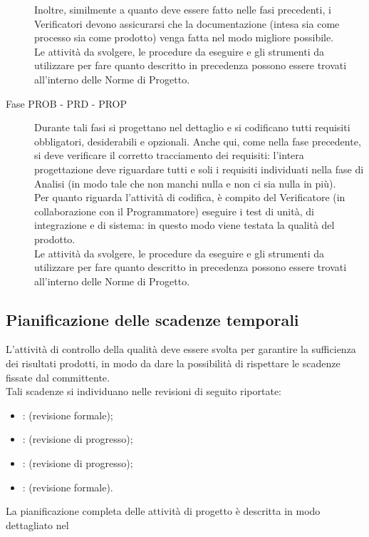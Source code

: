 \begin{description}
		Inoltre, similmente a quanto deve essere fatto nelle fasi precedenti, i Verificatori devono assicurarsi che la documentazione (intesa sia 
		come processo sia come prodotto) venga fatta nel modo migliore possibile.\\
		Le attività da svolgere, le procedure da eseguire e gli strumenti da utilizzare per fare quanto descritto in precedenza possono essere trovati 
		all'interno delle Norme di Progetto.
		\item[Fase PROB - PRD - PROP] Durante tali fasi si progettano nel dettaglio e si codificano tutti requisiti obbligatori, desiderabili e 
		opzionali. Anche qui, come nella fase precedente, si deve verificare il corretto tracciamento dei requisiti: l'intera progettazione deve 
		riguardare tutti e soli i requisiti individuati nella fase di Analisi (in modo tale che non manchi nulla e non ci sia nulla in più).\\
		Per quanto riguarda l'attività di codifica, è compito del Verificatore (in collaborazione con il Programmatore) eseguire i test di unità, di 
		integrazione e di sistema: in questo modo viene testata la qualità del prodotto.\\
		Le attività da svolgere, le procedure da eseguire e gli strumenti da utilizzare per fare quanto descritto in precedenza possono essere trovati 
		all'interno delle Norme di Progetto.
	\end{description}
	\subsection{Pianificazione delle scadenze temporali}
	L'attività di controllo della qualità deve essere svolta per garantire la sufficienza dei risultati prodotti, in modo da dare la possibilità di rispettare le scadenze fissate dal committente.\\
	Tali scadenze si individuano nelle revisioni di seguito riportate:
		\begin{itemize}
			\item {}:  (revisione formale);
			\item {}:  (revisione di progresso);
			\item {}:  (revisione di progresso);
			\item {}:  (revisione formale).
		\end{itemize}
	La pianificazione completa delle attività di progetto è descritta in modo dettagliato nel 
